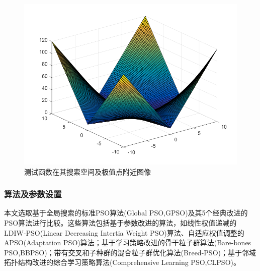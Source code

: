 \begin{figure}[htbp]
{\begin{minipage}[b]{0.23\linewidth}
				\includegraphics[width=1\linewidth]{pic/7Schwefel}\vspace{4pt}
		\end{minipage}}
		\caption{测试函数在其搜索空间及极值点附近图像}
		\label{figfunction}
\end{figure}



\subsubsection{算法及参数设置}
本文选取基于全局搜索的标准PSO算法(Global PSO,GPSO)及其5个经典改进的PSO算法进行比较。这些算法包括基于参数改进的算法，如线性权值递减的LDIW-PSO(Linear Decreasing Intertia Weight PSO)算法\cite{Xin2009A}、自适应权值调整的APSO(Adaptation PSO)算法\cite{Clerc2002The}；基于学习策略改进的骨干粒子群算法(Bare-bones PSO,BBPSO)\cite{Kennedy2003Bare}\cite{Campos2013Hierarchical}；带有交叉和子种群的混合粒子群优化算法(Breed-PSO)\cite{Gunn2012A}；基于邻域拓扑结构改进的综合学习策略算法(Comprehensive Learning PSO,CLPSO)\cite{Huang2006Comprehensive}。

